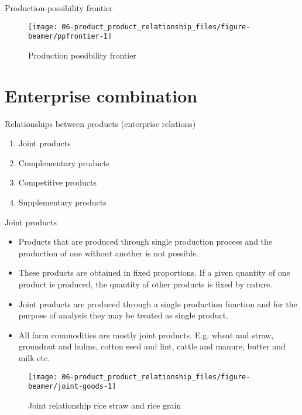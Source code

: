 \documentclass[12pt,ignorenonframetext,aspectratio=169]{beamer}
\providecommand{\tightlist}{%
  \setlength{\itemsep}{0pt}\setlength{\parskip}{0pt}}
\begin{document}
\begin{frame}{Production-possibility frontier}
\protect\hypertarget{production-possibility-frontier-1}{}
\begin{figure}
\texttt{[image: 06-product\_product\_relationship\_files/figure-beamer/ppfrontier-1]} \caption{Production possibility frontier}\label{fig:ppfrontier}
\end{figure}
\end{frame}

\hypertarget{enterprise-combination}{%
\section{Enterprise combination}\label{enterprise-combination}}

\begin{frame}{Relationships between products (enterprise relations)}
\protect\hypertarget{relationships-between-products-enterprise-relations}{}
\begin{enumerate}
\tightlist
\item
  Joint products
\item
  Complementary products
\item
  Competitive products
\item
  Supplementary products
\end{enumerate}
\end{frame}

\begin{frame}{Joint products}
\protect\hypertarget{joint-products}{}
\begin{itemize}
\tightlist
\item
  Products that are produced through single production process and the
  production of one without another is not possible.
\item
  These products are obtained in fixed proportions. If a given quantity
  of one product is produced, the quantity of other products is fixed by
  nature.
\item
  Joint products are produced through a single production function and
  for the purpose of analysis they may be treated as single product.
\item
  All farm commodities are mostly joint products. E.g. wheat and straw,
  groundnut and hulms, cotton seed and lint, cattle and manure, butter
  and milk etc.
\end{itemize}
\end{frame}

\begin{frame}{}
\protect\hypertarget{section}{}
\begin{figure}

{\centering \texttt{[image: 06-product\_product\_relationship\_files/figure-beamer/joint-goods-1]} 

}

\caption{Joint relationship rice straw and rice grain}\label{fig:joint-goods}
\end{figure}
\end{frame}
\end{document}
